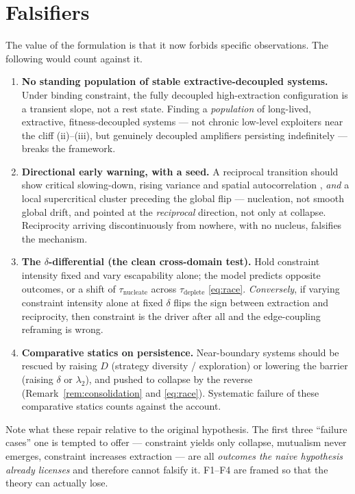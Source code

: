 \documentclass[11pt]{article}
\theoremstyle{plain}
\theoremstyle{definition}
\begin{document}
\section{Falsifiers}
\label{sec:falsifiers}

The value of the formulation is that it now forbids specific observations. The following would count against it.

\begin{enumerate}[label=\textbf{F\arabic*.}]
\item \textbf{No standing population of stable extractive-decoupled systems.} Under binding constraint, the fully decoupled high-extraction configuration is a transient slope, not a rest state. Finding a \emph{population} of long-lived, extractive, fitness-decoupled systems --- not chronic low-level exploiters near the cliff (ii)--(iii), but genuinely decoupled amplifiers persisting indefinitely --- breaks the framework.
\item \textbf{Directional early warning, with a seed.} A reciprocal transition should show critical slowing-down, rising variance and spatial autocorrelation \cite{scheffer2009}, \emph{and} a local supercritical cluster preceding the global flip --- nucleation, not smooth global drift, and pointed at the \emph{reciprocal} direction, not only at collapse. Reciprocity arriving discontinuously from nowhere, with no nucleus, falsifies the mechanism.
\item \textbf{The $\delta$-differential (the clean cross-domain test).} Hold constraint intensity fixed and vary escapability alone; the model predicts opposite outcomes, or a shift of $\tau_{\text{nucleate}}$ across $\tau_{\text{deplete}}$ \eqref{eq:race}. \emph{Conversely}, if varying constraint intensity alone at fixed $\delta$ flips the sign between extraction and reciprocity, then constraint is the driver after all and the edge-coupling reframing is wrong.
\item \textbf{Comparative statics on persistence.} Near-boundary systems should be rescued by raising $D$ (strategy diversity / exploration) or lowering the barrier (raising $\delta$ or $\lambda_2$), and pushed to collapse by the reverse (Remark~\ref{rem:consolidation} and \eqref{eq:race}). Systematic failure of these comparative statics counts against the account.
\end{enumerate}

Note what these repair relative to the original hypothesis. The first three ``failure cases'' one is tempted to offer --- constraint yields only collapse, mutualism never emerges, constraint increases extraction --- are all \emph{outcomes the naive hypothesis already licenses} and therefore cannot falsify it. F1--F4 are framed so that the theory can actually lose.
\end{document}
